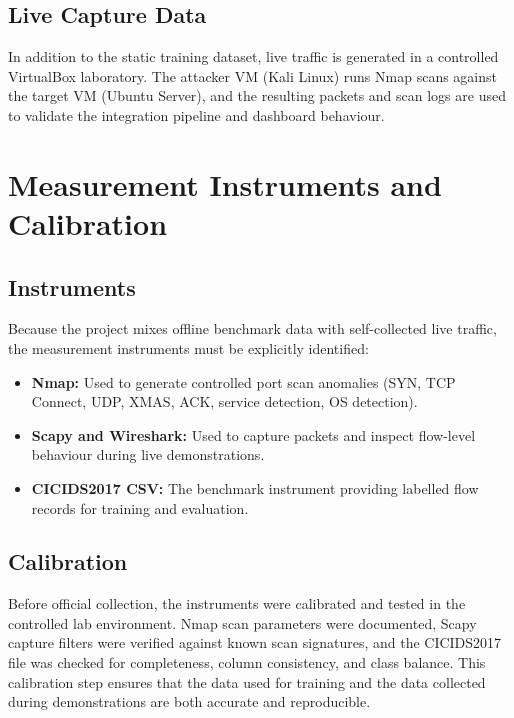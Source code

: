 \documentclass[12pt,a4paper]{report}
\begin{document}
\subsection{Live Capture Data}

In addition to the static training dataset, live traffic is generated in a controlled VirtualBox laboratory. The attacker VM (Kali Linux) runs Nmap scans against the target VM (Ubuntu Server), and the resulting packets and scan logs are used to validate the integration pipeline and dashboard behaviour.

\section{Measurement Instruments and Calibration}\label{sec:instruments}

\subsection{Instruments}

Because the project mixes offline benchmark data with self-collected live traffic, the measurement instruments must be explicitly identified:

\begin{itemize}
    \item \textbf{Nmap:} Used to generate controlled port scan anomalies (SYN, TCP Connect, UDP, XMAS, ACK, service detection, OS detection).
    \item \textbf{Scapy and Wireshark:} Used to capture packets and inspect flow-level behaviour during live demonstrations.
    \item \textbf{CICIDS2017 CSV:} The benchmark instrument providing labelled flow records for training and evaluation.
\end{itemize}

\subsection{Calibration}

Before official collection, the instruments were calibrated and tested in the controlled lab environment. Nmap scan parameters were documented, Scapy capture filters were verified against known scan signatures, and the CICIDS2017 file was checked for completeness, column consistency, and class balance. This calibration step ensures that the data used for training and the data collected during demonstrations are both accurate and reproducible.
\end{document}
